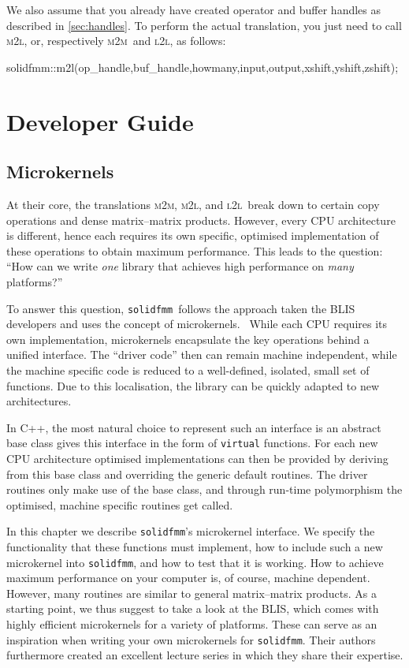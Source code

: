 \documentclass{scrbook}
\newcommand{\solidfmm}{\texttt{solidfmm}}
\newcommand{\MtoM}{\textsc{m2m}}
\newcommand{\MtoL}{\textsc{m2l}}
\newcommand{\LtoL}{\textsc{l2l}}
\begin{document}
We also assume that you already have created operator and buffer handles
as described in \cref{sec:handles}. To perform the actual translation, you just
need to call \MtoL, or, respectively \MtoM\ and \LtoL, as follows:
\begin{cppcode*}
solidfmm::m2l(op_handle,buf_handle,howmany,input,output,xshift,yshift,zshift);
\end{cppcode*}


\part{Developer Guide}\label{part:developer}

\chapter{Microkernels}
At their core, the translations \MtoM, \MtoL, and \LtoL\ break down to certain
copy operations and dense matrix--matrix products. However, every CPU
architecture is different, hence each requires its own specific, optimised
implementation of these operations to obtain maximum performance. This leads
to the question: \enquote{How can we write \emph{one} library that achieves
high performance on \emph{many} platforms?}

To answer this question, \solidfmm\ follows the approach taken the BLIS
developers and uses the concept of
microkernels.~\autocite{blispaper,laffproject} While each CPU requires its own
implementation, microkernels encapsulate the key operations behind a unified
interface. The \enquote{driver code} then can remain machine independent, while
the machine specific code is reduced to a well-defined, isolated, small
set of functions. Due to this localisation, the library can be quickly
adapted to new architectures.

In C++, the most natural choice to represent such an interface is an abstract
base class gives this interface in the form of \lstinline[style=cpp]|virtual|
functions. For each new CPU architecture optimised implementations can then be
provided by deriving from this base class and overriding the generic default
routines. The driver routines only make use of the base class, and through
run-time polymorphism the optimised, machine specific routines get called.

In this chapter we describe \solidfmm's microkernel interface. We specify the
functionality that these functions must implement, how to include such
a new microkernel into \solidfmm, and how to test that it is working. How to
achieve maximum performance on your computer is, of course, machine dependent.
However, many routines are similar to general matrix--matrix products. As a
starting point, we thus suggest to take a look at the
BLIS,\autocite{blisproject} which comes with highly efficient microkernels for
a variety of platforms. These can serve as an inspiration when writing your own
microkernels for \solidfmm. Their authors furthermore created an excellent
lecture series in which they share their expertise.\autocite{laffproject}
\end{document}
